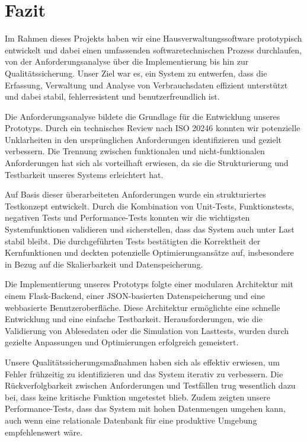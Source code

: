 \newpage
\section{Fazit}\label{sec:fazit}


Im Rahmen dieses Projekts haben wir eine Hausverwaltungssoftware prototypisch entwickelt und dabei einen umfassenden softwaretechnischen Prozess durchlaufen, von der Anforderungsanalyse über die Implementierung bis hin zur Qualitätssicherung.
Unser Ziel war es, ein System zu entwerfen, dass die Erfassung, Verwaltung und Analyse von Verbrauchsdaten effizient unterstützt und dabei stabil, fehlerresistent und benutzerfreundlich ist.

Die Anforderungsanalyse bildete die Grundlage für die Entwicklung unseres Prototyps.
Durch ein technisches Review nach ISO 20246 konnten wir potenzielle Unklarheiten in den ursprünglichen Anforderungen identifizieren und gezielt verbessern.
Die Trennung zwischen funktionalen und nicht-funktionalen Anforderungen hat sich als vorteilhaft erwiesen, da sie die Strukturierung und Testbarkeit unseres Systems erleichtert hat.

Auf Basis dieser überarbeiteten Anforderungen wurde ein strukturiertes Testkonzept entwickelt.
Durch die Kombination von Unit-Tests, Funktionstests, negativen Tests und Performance-Tests konnten wir die wichtigsten Systemfunktionen validieren und sicherstellen, dass das System auch unter Last stabil bleibt.
Die durchgeführten Tests bestätigten die Korrektheit der Kernfunktionen und deckten potenzielle Optimierungsansätze auf, insbesondere in Bezug auf die Skalierbarkeit und Datenspeicherung.

Die Implementierung unseres Prototyps folgte einer modularen Architektur mit einem Flask-Backend, einer JSON-basierten Datenspeicherung und eine webbasierte Benutzeroberfläche.
Diese Architektur ermöglichte eine schnelle Entwicklung und eine einfache Testbarkeit.
Herausforderungen, wie die Validierung von Ablesedaten oder die Simulation von Lasttests, wurden durch gezielte Anpassungen und Optimierungen erfolgreich gemeistert.

Unsere Qualitätssicherungsmaßnahmen haben sich als effektiv erwiesen, um Fehler frühzeitig zu identifizieren und das System iterativ zu verbessern. 
Die Rückverfolgbarkeit zwischen Anforderungen und Testfällen trug wesentlich dazu bei, dass keine kritische Funktion ungetestet blieb.
Zudem zeigten unsere Performance-Tests, dass das System mit hohen Datenmengen umgehen kann, auch wenn eine relationale Datenbank für eine produktive Umgebung empfehlenswert wäre.

